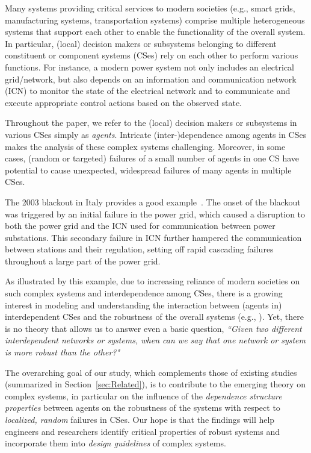 \documentclass[10pt, journal, compsoc]{IEEEtran}
\begin{document}
Many systems providing critical services to modern
societies (e.g., 
smart grids, manufacturing systems, transportation 
systems) comprise multiple 
heterogeneous systems that support each other
to enable the functionality of the overall system.
In particular, (local) decision makers or subsystems
belonging to different constituent or
component systems (CSes) rely on each other to 
perform various functions. 
For instance, a modern power system not only includes 
an electrical grid/network, but also depends on an 
information and communication network (ICN) to 
monitor the state of the electrical network and 
to communicate and execute appropriate control 
actions based on the observed state. 

Throughout the paper, we refer to the 
(local) decision makers or subsystems in various
CSes simply as {\em agents}.
Intricate (inter-)dependence among agents in CSes 
makes the analysis of these complex systems challenging. 
Moreover, in some cases, (random or targeted) 
failures of a small number of agents in one CS have
potential to cause unexpected, widespread failures 
of many agents in multiple CSes. 

The 2003 blackout in Italy provides
a good example~\cite{Rosato2008}.  
The onset of the blackout was 
triggered by an initial failure in the power grid, 
which caused a disruption to both the power grid 
and the ICN used for communication between power 
substations. This secondary failure in ICN further 
hampered the communication between stations and 
their regulation, setting off
rapid cascading failures throughout a large part
of the power grid.  

As illustrated by this example, due to increasing 
reliance of modern societies on such complex 
systems and interdependence among CSes, there is 
a growing interest in modeling and understanding 
the interaction between (agents in) interdependent 
CSes and the robustness of the overall systems
(e.g., \cite{Albert2000, Baxter2012, 
Buldyrev2010, Gao2011, Kenett2014, Rosato2008, 
Shao2011, Son2012, Vesp, Zhuang2016}). Yet, 
there is no theory that allows us to answer even 
a basic question, {\em ``Given two different 
interdependent networks or systems, when can
we say that one network or system is more
robust than the other?"}

The overarching goal of our study, which 
complements those of existing studies (summarized
in Section~\ref{sec:Related}), is to 
contribute to the emerging theory on complex 
systems, in particular on the influence of 
the {\em dependence structure properties} 
between agents
on the robustness of the systems with respect to 
{\em localized, random} failures in CSes. 
Our hope is that the findings will help engineers
and researchers identify critical properties
of robust systems and incorporate them into
{\em design guidelines} of complex systems. 
\end{document}
